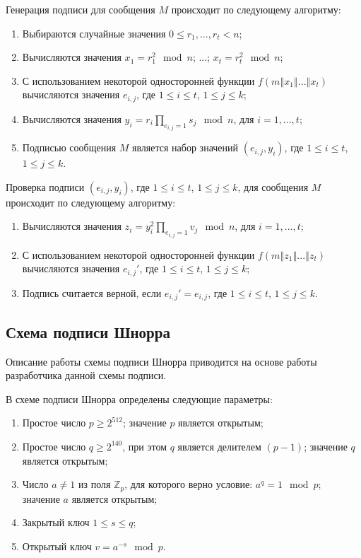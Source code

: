 \documentclass{./civarticle}
\begin{document}
Генерация подписи для сообщения $M$ происходит по следующему алгоритму:

\begin{enumerate}
    \item Выбираются случайные значения $0 \leq r_1, ..., r_t < n$;
    \item Вычисляются значения $x_1 = r_1^2 \mod n$; ...; $x_t = r_t^2 \mod n$;
    \item С использованием некоторой односторонней функции $f(m \mathbin\Vert x_1 \mathbin\Vert ... \mathbin\Vert x_t)$ вычисляются значения $e_{i, j}$, где $1 \leq i  \leq t$, $1 \leq j \leq k$;
    \item Вычисляются значения $y_i = r_i\prod\limits_{e_{i, j} = 1} s_j \mod n$, для $i = 1, ..., t$;
    \item Подписью сообщения $M$ является набор значений $(e_{i, j}, y_i)$, где $1 \leq i  \leq t$, $1 \leq j \leq k$.
\end{enumerate}

Проверка подписи $(e_{i, j}, y_i)$, где $1 \leq i  \leq t$, $1 \leq j \leq k$, для сообщения $M$ происходит по следующему алгоритму:

\begin{enumerate}
    \item Вычисляются значения $z_i = y_i^2 \prod\limits_{e_{i, j} = 1} v_j \mod n$, для $i = 1, ..., t$;
    \item С использованием некоторой односторонней функции $f(m \mathbin\Vert z_1 \mathbin\Vert ... \mathbin\Vert z_t)$ вычисляются значения $e_{i, j}'$, где $1 \leq i  \leq t$, $1 \leq j \leq k$;
    \item Подпись считается верной, если $e_{i, j}' = e_{i, j}$, где $1 \leq i  \leq t$, $1 \leq j \leq k$.
\end{enumerate}

\subsection{Схема подписи Шнорра}

Описание работы схемы подписи Шнорра приводится на основе работы \cite{schnorr} разработчика данной схемы подписи.

В схеме подписи Шнорра определены следующие параметры:

\begin{enumerate}
    \item Простое число $p \geq 2^{512}$; значение $p$ является открытым;
    \item Простое число $q \geq 2^{140}$, при этом $q$ является делителем $(p - 1)$; значение $q$ является открытым;
    \item Число $a \neq 1$ из поля $\mathbb{Z}_p$, для которого верно условие: $a^q = 1 \mod p$; значение $a$ является открытым;
    \item Закрытый ключ $1 \leq s \leq q$;
    \item Открытый ключ $v = a^{-s} \mod p$.
\end{enumerate}
\end{document}
